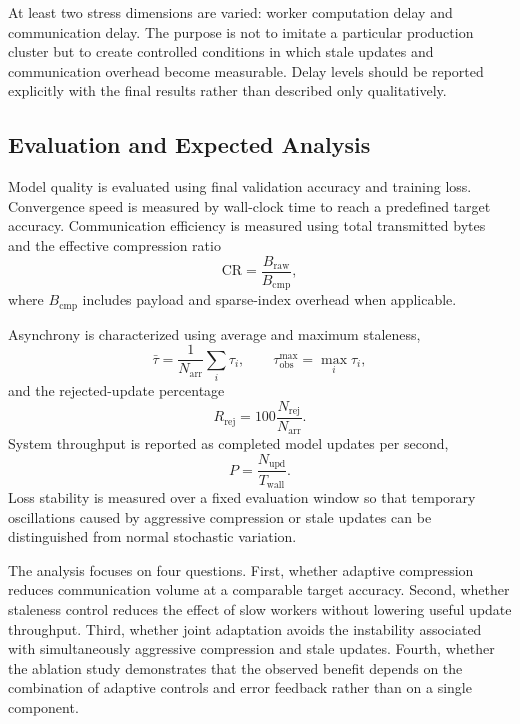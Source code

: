 \documentclass[conference]{IEEEtran}
\begin{document}
At least two stress dimensions are varied: worker computation delay and communication delay. The purpose is not to imitate a particular production cluster but to create controlled conditions in which stale updates and communication overhead become measurable. Delay levels should be reported explicitly with the final results rather than described only qualitatively.

\subsection{Evaluation and Expected Analysis}
\label{subsec:evaluation}

Model quality is evaluated using final validation accuracy and training loss. Convergence speed is measured by wall-clock time to reach a predefined target accuracy. Communication efficiency is measured using total transmitted bytes and the effective compression ratio
\begin{equation}
 \mathrm{CR}=\frac{B_{\mathrm{raw}}}{B_{\mathrm{cmp}}},
 \label{eq:cr}
\end{equation}
where $B_{\mathrm{cmp}}$ includes payload and sparse-index overhead when applicable.

Asynchrony is characterized using average and maximum staleness,
\begin{equation}
 \bar\tau=\frac{1}{N_{\mathrm{arr}}}\sum_i\tau_i,
 \qquad
 \tau_{\mathrm{obs}}^{\max}=\max_i\tau_i,
 \label{eq:stale_metrics}
\end{equation}
and the rejected-update percentage
\begin{equation}
 R_{\mathrm{rej}}=100\frac{N_{\mathrm{rej}}}{N_{\mathrm{arr}}}.
 \label{eq:rej}
\end{equation}
System throughput is reported as completed model updates per second,
\begin{equation}
 P=\frac{N_{\mathrm{upd}}}{T_{\mathrm{wall}}}.
 \label{eq:throughput}
\end{equation}
Loss stability is measured over a fixed evaluation window so that temporary oscillations caused by aggressive compression or stale updates can be distinguished from normal stochastic variation.

The analysis focuses on four questions. First, whether adaptive compression reduces communication volume at a comparable target accuracy. Second, whether staleness control reduces the effect of slow workers without lowering useful update throughput. Third, whether joint adaptation avoids the instability associated with simultaneously aggressive compression and stale updates. Fourth, whether the ablation study demonstrates that the observed benefit depends on the combination of adaptive controls and error feedback rather than on a single component.
\end{document}
